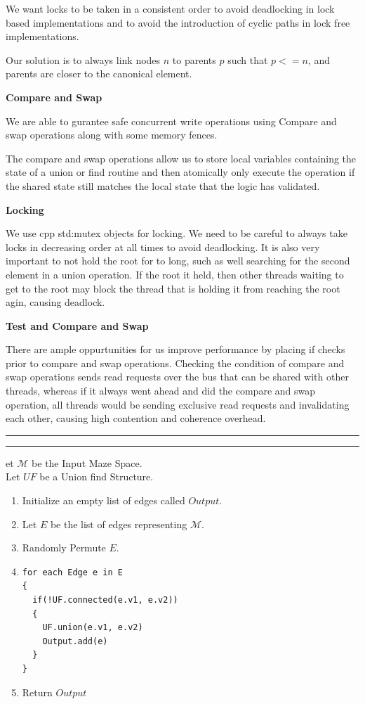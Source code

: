 \documentclass[11pt]{article}
\newcommand{\question}[2] {\vspace{.25in} \hrule\vspace{0.5em}
\noindent{\bf #1: #2} \vspace{0.5em}
\hrule \vspace{.10in}}
\begin{document}
We want locks to be taken in a consistent order to avoid deadlocking in lock based implementations and to avoid the introduction of cyclic paths in lock free implementations.

Our solution is to always link nodes $n$ to parents $p$ such that $p <= n$, and parents are closer to the canonical element.


\textbf{Compare and Swap}

We are able to gurantee safe concurrent write operations using Compare and swap operations along with some memory fences.

The compare and swap operations allow us to store local variables containing the state of a union or find routine and then atomically only execute the operation if the shared state still matches the local state that the logic has validated.

\textbf{Locking}

We use cpp std:mutex objects for locking. We need to be careful to always take locks in decreasing order at all times to avoid deadlocking. It is also very important to not hold the root for to long, such as well searching for the second element in a union operation. If the root it held, then other threads waiting to get to the root may block the thread that is holding it from reaching the root agin, causing deadlock.

\newpage

\textbf{Test and Compare and Swap}

There are ample oppurtunities for us improve performance by placing if checks prior to compare and swap operations. Checking the condition of compare and swap operations sends read requests over the bus that can be shared with other threads, whereas if it always went ahead and did the compare and swap operation, all threads would be sending exclusive read requests and invalidating each other, causing high contention and coherence overhead.

\newpage

\question{Serial Maze Construction Algorithm}

Let $\mathcal{M}$ be the Input Maze Space.\\
Let $UF$ be a Union find Structure.\\

\begin{enumerate}[1.]

\item Initialize an empty list of edges called $Output$.
\item Let $E$ be the list of edges representing $\mathcal{M}$.
\item Randomly Permute $E$.
\item
\begin{verbatim}
for each Edge e in E
{
  if(!UF.connected(e.v1, e.v2))
  {
    UF.union(e.v1, e.v2)
    Output.add(e)
  }
}
\end{verbatim}
\item Return $Output$
\end{enumerate}
\end{document}

